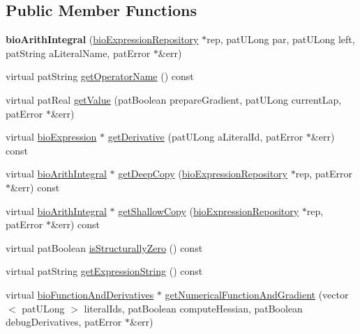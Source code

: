 \subsection*{Public Member Functions}
\begin{DoxyCompactItemize}
\item 
\mbox{\label{classbio_arith_integral_a62142176f2d4ac54ed701082366ad102}} 
{\bfseries bio\+Arith\+Integral} (\hyperlink{classbio_expression_repository}{bio\+Expression\+Repository} $\ast$rep, pat\+U\+Long par, pat\+U\+Long left, pat\+String a\+Literal\+Name, pat\+Error $\ast$\&err)
\item 
virtual pat\+String \hyperlink{classbio_arith_integral_abae8e14e091ddc4e7281ec5ba36f8cf8}{get\+Operator\+Name} () const
\item 
virtual pat\+Real \hyperlink{classbio_arith_integral_a71c94eed284b1ef9e492aa6424c33365}{get\+Value} (pat\+Boolean prepare\+Gradient, pat\+U\+Long current\+Lap, pat\+Error $\ast$\&err)
\item 
virtual \hyperlink{classbio_expression}{bio\+Expression} $\ast$ \hyperlink{classbio_arith_integral_aafdf4edef91568b929fc3e9cd199b202}{get\+Derivative} (pat\+U\+Long a\+Literal\+Id, pat\+Error $\ast$\&err) const
\item 
virtual \hyperlink{classbio_arith_integral}{bio\+Arith\+Integral} $\ast$ \hyperlink{classbio_arith_integral_a49fa38b94818140c143ecb6cb3d7ceed}{get\+Deep\+Copy} (\hyperlink{classbio_expression_repository}{bio\+Expression\+Repository} $\ast$rep, pat\+Error $\ast$\&err) const
\item 
virtual \hyperlink{classbio_arith_integral}{bio\+Arith\+Integral} $\ast$ \hyperlink{classbio_arith_integral_a0a9619e66e582266bf1975d59b7c2bec}{get\+Shallow\+Copy} (\hyperlink{classbio_expression_repository}{bio\+Expression\+Repository} $\ast$rep, pat\+Error $\ast$\&err) const
\item 
virtual pat\+Boolean \hyperlink{classbio_arith_integral_a7f96ce250c987eb2022512c9f65cdc1b}{is\+Structurally\+Zero} () const
\item 
virtual pat\+String \hyperlink{classbio_arith_integral_a597593196620aa13462aebf9166f1678}{get\+Expression\+String} () const
\item 
virtual \hyperlink{classbio_function_and_derivatives}{bio\+Function\+And\+Derivatives} $\ast$ \hyperlink{classbio_arith_integral_a7f9cc73a8a9788b1deb8c2f424606d51}{get\+Numerical\+Function\+And\+Gradient} (vector$<$ pat\+U\+Long $>$ literal\+Ids, pat\+Boolean compute\+Hessian, pat\+Boolean debug\+Derivatives, pat\+Error $\ast$\&err)
\end{DoxyCompactItemize}

